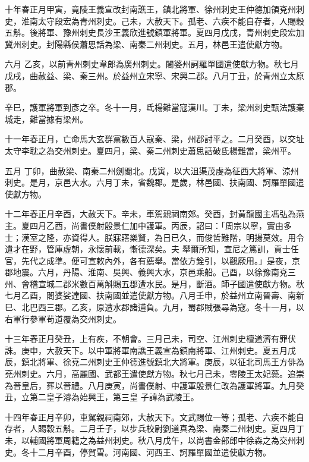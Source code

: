 \begin{pinyinscope}
 十年春正月甲寅，竟陵王義宣改封南譙王，鎮北將軍、徐州刺史王仲德加領兗州刺史，淮南太守段宏為青州刺史。己未，大赦天下。孤老、六疾不能自存者，人賜穀五斛。後將軍、豫州刺史長沙王義欣進號鎮軍將軍。夏四月戊戌，青州刺史段宏加冀州刺史。封陽縣侯蕭思話為梁、南秦二州刺史。五月，林邑王遣使獻方物。



 六月
 乙亥，以前青州刺史韋郎為廣州刺史。闍婆州訶羅單國遣使獻方物。秋七月戊戌，曲赦益、梁、秦三州。於益州立宋寧、宋興二郡。八月丁丑，於青州立太原郡。



 辛巳，護軍將軍到彥之卒。冬十一月，氐楊難當寇漢川。丁未，梁州刺史甄法護棄城走，難當據有梁州。



 十一年春正月，亡命馬大玄群黨數百人寇秦、梁，州郡討平之。二月癸酉，以交址太守李耽之為交州刺史。夏四月，梁、秦二州刺史蕭思話破氐楊難當，梁州平。



 五月
 丁卯，曲赦梁、南秦二州劍閣北。戊寅，以大沮渠茂虔為征西大將軍、涼州刺史。是月，京邑大水。六月丁未，省魏郡。是歲，林邑國、扶南國、訶羅單國遣使獻方物。



 十二年春正月辛酉，大赦天下。辛未，車駕親祠南郊。癸酉，封黃龍國主馮弘為燕主。夏四月乙酉，尚書僕射殷景仁加中護軍。丙辰，詔曰：「周宗以寧，實由多士；漢室之隆，亦資得人。朕寐寤樂賢，為日已久，而俊哲難階，明揚莫效。用令遺才在野，管庫虛朝，永懷前載，慚德深矣。夫
 舉爾所知，宣尼之篤訓，貢士任官，先代之成準。便可宣敕內外，各有薦舉。當依方銓引，以觀厥用。」是夜，京郡地震。六月，丹陽、淮南、吳興、義興大水，京邑乘船。己酉，以徐豫南兗三州、會稽宣城二郡米數百萬斛賜五郡遭水民。是月，斷酒。師子國遣使獻方物。秋七月乙酉，闍婆娑達國、扶南國並遣使獻方物。八月壬申，於益州立南晉壽、南新巳、北巴西三郡。乙亥，原遭水郡諸逋負。九月，蜀郡賊張尋為寇。冬十一月，以右軍行參軍茍道覆為交州刺史。



 十三年春正月癸丑，上有疾，不朝會。三月己未，司空、江州刺史檀道濟有罪伏誅。庚申，大赦天下。以中軍將軍南譙王義宣為鎮南將軍、江州刺史。夏五月戊辰，鎮北將軍、徐兗二州刺史王仲德進號鎮北大將軍。庚辰，以征北司馬王方俳為兗州刺史。六月，高麗國、武都王遣使獻方物。秋七月己未，零陵王太妃薨。追崇為晉皇后，葬以晉禮。八月庚寅，尚書僕射、中護軍殷景仁改為護軍將軍。九月癸丑，立第二皇子濬為始興王，第三皇
 子諱為武陵王。



 十四年春正月辛卯，車駕親祠南郊，大赦天下。文武賜位一等；孤老、六疾不能自存者，人賜穀五斛。二月壬子，以步兵校尉劉道真為梁、南秦二州刺史。夏四月丁未，以輔國將軍周籍之為益州刺史。秋八月戊午，以尚書金部郎中徐森之為交州刺史。冬十二月辛酉，停賀雪。河南國、河西王、訶羅單國並遣使獻方物。




\end{pinyinscope}
